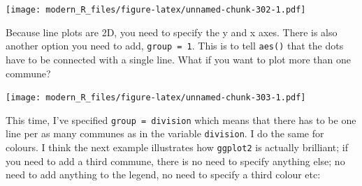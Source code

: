 \documentclass[]{gitbook}
\newenvironment{Shaded}{\begin{snugshade}}{\end{snugshade}}
\newcommand{\DataTypeTok}[1]{\textcolor[rgb]{0.13,0.29,0.53}{#1}}
\newcommand{\KeywordTok}[1]{\textcolor[rgb]{0.13,0.29,0.53}{\textbf{#1}}}
\newcommand{\NormalTok}[1]{#1}
\newcommand{\OperatorTok}[1]{\textcolor[rgb]{0.81,0.36,0.00}{\textbf{#1}}}
\newcommand{\StringTok}[1]{\textcolor[rgb]{0.31,0.60,0.02}{#1}}
\theoremstyle{definition}
\theoremstyle{definition}
\theoremstyle{definition}
\theoremstyle{remark}
\begin{document}
\texttt{[image: modern\_R\_files/figure-latex/unnamed-chunk-302-1.pdf]}

Because line plots are 2D, you need to specify the y and x axes. There
is also another option you need to add, \texttt{group\ =\ 1}. This is to
tell \texttt{aes()} that the dots have to be connected with a single
line. What if you want to plot more than one commune?

\begin{Shaded}
\end{Shaded}

\texttt{[image: modern\_R\_files/figure-latex/unnamed-chunk-303-1.pdf]}

This time, I've specified \texttt{group\ =\ division} which means that
there has to be one line per as many communes as in the variable
\texttt{division}. I do the same for colours. I think the next example
illustrates how \texttt{ggplot2} is actually brilliant; if you need to
add a third commune, there is no need to specify anything else; no need
to add anything to the legend, no need to specify a third colour etc:

\begin{Shaded}
\end{Shaded}
\end{document}
